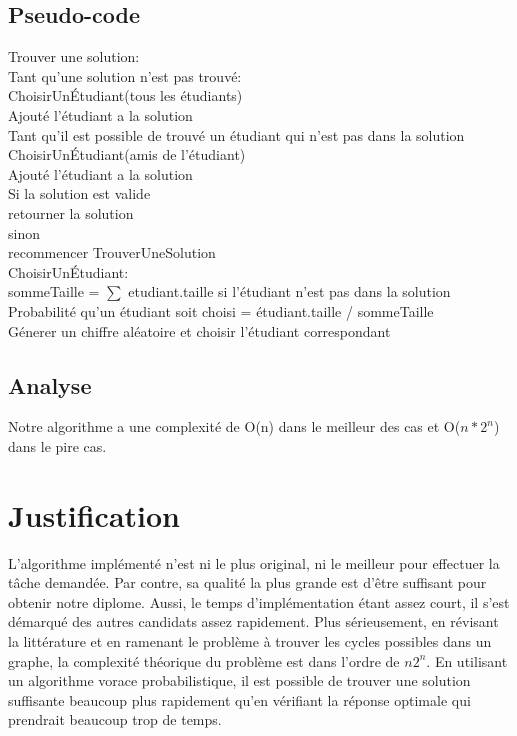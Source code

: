 \documentclass[a4paper, 12pt]{article} %
\newcommand\tab[1][1cm]{\hspace*{#1}}
\begin{document}
\subsection*{Pseudo-code}
Trouver une solution:\\
\tab    Tant qu'une solution n'est pas trouvé: \\
\tab\tab        ChoisirUnÉtudiant(tous les étudiants) \\
\tab\tab        Ajouté l'étudiant a la solution \\
\tab\tab        Tant qu'il est possible de trouvé un étudiant qui n'est pas dans la solution \\
\tab\tab\tab            ChoisirUnÉtudiant(amis de l'étudiant) \\
\tab\tab\tab            Ajouté l'étudiant a la solution \\
\tab\tab        Si la solution est valide \\
\tab\tab\tab            retourner la solution \\
\tab\tab        sinon \\
\tab\tab\tab            recommencer TrouverUneSolution\\
ChoisirUnÉtudiant:\\
\tab     sommeTaille = $\sum$ etudiant.taille si l'étudiant n'est pas dans la solution \\
\tab     Probabilité qu'un étudiant soit choisi = étudiant.taille / sommeTaille \\ 
\tab     Génerer un chiffre aléatoire et choisir l'étudiant correspondant\\
\subsection*{Analyse}
Notre algorithme a une complexité de O(n) dans le meilleur des cas et O($n*2^n$) dans le pire cas.
\section*{Justification}
L'algorithme implémenté n'est ni le plus original, ni le meilleur pour effectuer la tâche demandée.
Par contre, sa qualité la plus grande est d'être suffisant pour obtenir notre diplome.
Aussi, le temps d'implémentation étant assez court, il s'est démarqué des autres candidats assez rapidement.
Plus sérieusement, en révisant la littérature et en ramenant le problème à trouver les
cycles possibles dans un graphe, la complexité théorique du problème est dans l'ordre de $n2^{n}$. En utilisant
un algorithme vorace probabilistique, il est possible de trouver une solution suffisante beaucoup plus rapidement
qu'en vérifiant la réponse optimale qui prendrait beaucoup trop de temps. 
\end{document}

